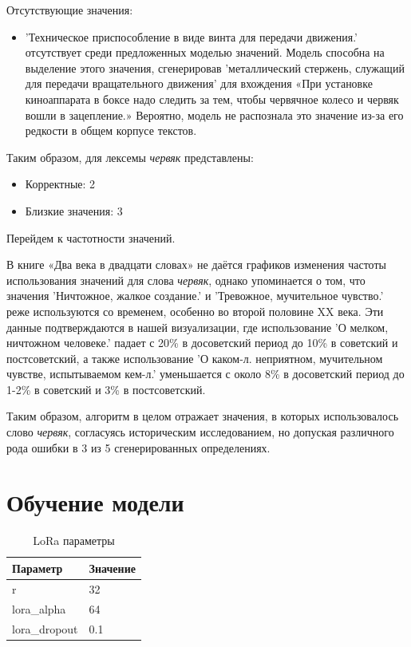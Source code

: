 Отсутствующие значения:
\begin{itemize}
    \item ’Техническое приспособление в виде винта для передачи движения.’ отсутствует среди предложенных моделью значений.
Модель способна на выделение этого значения, сгенерировав
’металлический стержень, служащий для передачи вращательного движения’ для вхождения
«При установке киноаппарата в боксе надо следить за тем, чтобы червячное колесо и
червяк вошли в зацепление.»
Вероятно, модель не распознала это значение из-за его редкости в общем корпусе текстов.
\end{itemize}

Таким образом, для лексемы \textit{червяк} представлены:

\begin{itemize}
    \item Корректные: 2
    \item Близкие значения: 3
\end{itemize}

Перейдем к частотности значений.

В книге «Два века в двадцати словах» не даётся графиков изменения частоты использования значений
для слова \textit{червяк}, однако упоминается о том, что значения
’Ничтожное, жалкое создание.’ и ’Тревожное, мучительное чувство.’
реже используются со временем, особенно во второй половине XX века.
Эти данные подтверждаются в нашей визуализации, где использование
’О мелком, ничтожном человеке.’ падает с 20\% в досоветский период до 10\% в советский и постсоветский,
а также использование ’О каком-л. неприятном, мучительном чувстве, испытываемом кем-л.’
уменьшается с около 8\% в досоветский период до 1-2\% в советский и 3\% в постсоветский.

Таким образом, алгоритм в целом отражает значения, в которых использовалось
слово \textit{червяк}, согласуясь историческим исследованием, но допуская различного рода ошибки
в 3 из 5 сгенерированных определениях.

\chapter{Обучение модели}

\begin{longtable}{ll}
\caption{LoRa параметры} \\
\hline
\textbf{Параметр} & \textbf{Значение} \\
\hline
r & 32 \\
lora\_alpha & 64 \\
lora\_dropout & 0.1 \\
\hline
\end{longtable}

